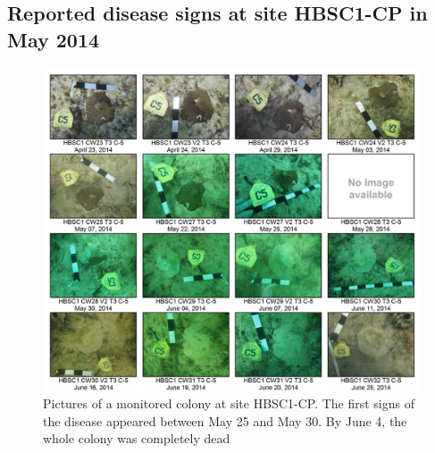 \begin{subappendices}
	\section{Reported disease signs at site HBSC1-CP in May 2014}\label{onset:appendice}
	\begin{figure}
		\centering
		\includegraphics[width=\textwidth]{chapters/onset/figures/hbsc1_cp.png}
		\caption{Pictures of a monitored colony at site HBSC1-CP. The first signs of the disease appeared between May 25 and May 30. By June 4, the whole colony was completely dead}
	\end{figure}
\end{subappendices}